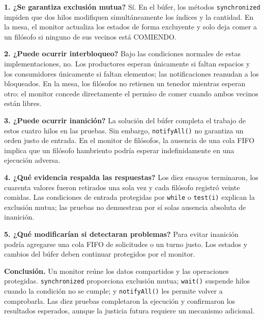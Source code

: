 \documentclass[12pt,oneside]{book}
\begin{document}
\textbf{1. ¿Se garantiza exclusión mutua?} Sí. En el búfer, los métodos \texttt{synchronized} impiden que dos hilos modifiquen simultáneamente los índices y la cantidad. En la mesa, el monitor actualiza los estados de forma excluyente y solo deja comer a un filósofo si ninguno de sus vecinos está COMIENDO.

\textbf{2. ¿Puede ocurrir interbloqueo?} Bajo las condiciones normales de estas implementaciones, no. Los productores esperan únicamente si faltan espacios y los consumidores únicamente si faltan elementos; las notificaciones reanudan a los bloqueados. En la mesa, los filósofos no retienen un tenedor mientras esperan otro: el monitor concede directamente el permiso de comer cuando ambos vecinos están libres.

\textbf{3. ¿Puede ocurrir inanición?} La solución del búfer completa el trabajo de estos cuatro hilos en las pruebas. Sin embargo, \texttt{notifyAll()} no garantiza un orden justo de entrada. En el monitor de filósofos, la ausencia de una cola FIFO implica que un filósofo hambriento podría esperar indefinidamente en una ejecución adversa.

\textbf{4. ¿Qué evidencia respalda las respuestas?} Los diez ensayos terminaron, los cuarenta valores fueron retirados una sola vez y cada filósofo registró veinte comidas. Las condiciones de entrada protegidas por \texttt{while} o \texttt{test(i)} explican la exclusión mutua; las pruebas no demuestran por sí solas ausencia absoluta de inanición.

\textbf{5. ¿Qué modificarían si detectaran problemas?} Para evitar inanición podría agregarse una cola FIFO de solicitudes o un turno justo. Los estados y cambios del búfer deben continuar protegidos por el monitor.

\textbf{Conclusión.} Un monitor reúne los datos compartidos y las operaciones protegidas. \texttt{synchronized} proporciona exclusión mutua; \texttt{wait()} suspende hilos cuando la condición no se cumple; y \texttt{notifyAll()} les permite volver a comprobarla. Las diez pruebas completaron la ejecución y confirmaron los resultados esperados, aunque la justicia futura requiere un mecanismo adicional.
\end{document}
